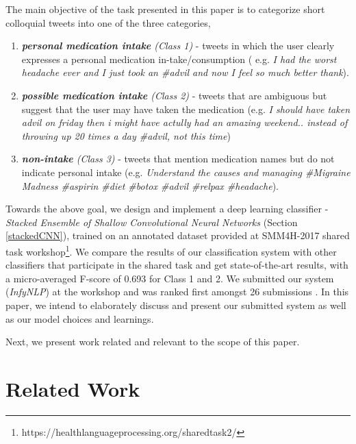 \documentclass[conference]{IEEEtran}
\begin{document}
The main objective of the task presented in this paper is to categorize short colloquial tweets into one of the three categories, 
\begin{enumerate}
\item \textit{\textbf{personal medication intake} (Class 1)} - tweets in which the user clearly expresses a personal medication in-take/consumption ( e.g. \textit{I had the worst headache ever and I just took an \@AdvilRelief \#advil and now I feel so much better thank}).
\item \textit{\textbf{possible medication intake} (Class 2)} - tweets that are ambiguous but suggest that the user may have taken the medication (e.g. \textit{I should have taken advil on friday then i might have actully had an amazing weekend.. instead of throwing up 20 times a day \#advil, not this time})
\item \textit{\textbf{non-intake} (Class 3)} - tweets that mention medication names but do not indicate personal intake (e.g. \textit{Understand the causes and managing \#Migraine Madness \#aspirin \#diet \#botox \#advil \#relpax \#headache}). 
\end{enumerate}

Towards the above goal, we design and implement a deep learning classifier - \textit{Stacked Ensemble of Shallow Convolutional Neural Networks} (Section \ref{stackedCNN}), trained on an annotated dataset provided at SMM4H-2017 shared task workshop\footnote{https://healthlanguageprocessing.org/sharedtask2/}. We compare the results of our classification system with other classifiers that participate in the shared task and get state-of-the-art results, with a micro-averaged F-score of 0.693 for Class 1 and 2. We submitted our system (\textit{InfyNLP}) at the workshop and was ranked first amongst 26 submissions \cite{sarker1overview, infynlpsmm4h}. In this paper, we intend to elaborately discuss and present our submitted system as well as our model choices and learnings.

Next, we present work related and relevant to the scope of this paper.

\section{Related Work}
\end{document}
